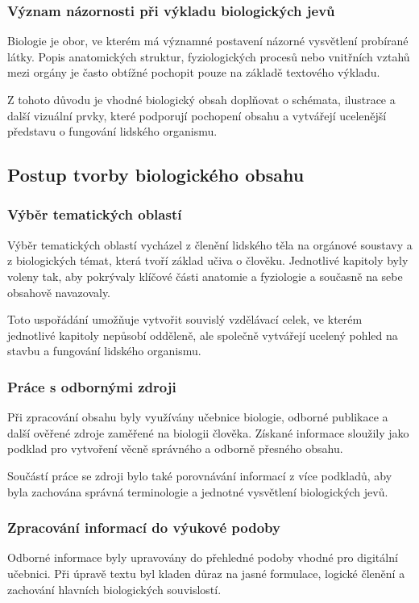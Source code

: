 \documentclass[12pt]{article}
\begin{document}
    \subsubsection{Význam názornosti při výkladu biologických jevů}
    Biologie je obor, ve kterém má významné postavení názorné vysvětlení probírané látky. Popis anatomických struktur, fyziologických procesů nebo vnitřních vztahů mezi orgány je často obtížné pochopit pouze na základě textového výkladu.

    Z tohoto důvodu je vhodné biologický obsah doplňovat o schémata, ilustrace a další vizuální prvky, které podporují pochopení obsahu a vytvářejí ucelenější představu o fungování lidského organismu.

    \subsection{Postup tvorby biologického obsahu}
    \subsubsection{Výběr tematických oblastí}
    Výběr tematických oblastí vycházel z členění lidského těla na orgánové soustavy a z biologických témat, která tvoří základ učiva o člověku. Jednotlivé kapitoly byly voleny tak, aby pokrývaly klíčové části anatomie a fyziologie a současně na sebe obsahově navazovaly.

    Toto uspořádání umožňuje vytvořit souvislý vzdělávací celek, ve kterém jednotlivé kapitoly nepůsobí odděleně, ale společně vytvářejí ucelený pohled na stavbu a fungování lidského organismu. \cite{GymhBiologie}

    \subsubsection{Práce s odbornými zdroji}
    Při zpracování obsahu byly využívány učebnice biologie, odborné publikace a další ověřené zdroje zaměřené na biologii člověka. Získané informace sloužily jako podklad pro vytvoření věcně správného a odborně přesného obsahu.

    Součástí práce se zdroji bylo také porovnávání informací z více podkladů, aby byla zachována správná terminologie a jednotné vysvětlení biologických jevů.
       \cite{MUZakladyAnatomie}
       \cite{KocarekBiologieCloveka}
       \cite{RosypalNovyPrehledBiologie}

    \subsubsection{Zpracování informací do výukové podoby}
    Odborné informace byly upravovány do přehledné podoby vhodné pro digitální učebnici. Při úpravě textu byl kladen důraz na jasné formulace, logické členění a zachování hlavních biologických souvislostí.
\end{document}
